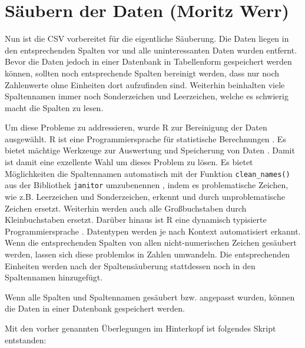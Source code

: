 \chapter{Säubern der Daten (Moritz Werr)} \label{chap:säubern}


Nun ist die CSV vorbereitet für die eigentliche Säuberung. Die Daten liegen in den entsprechenden Spalten vor und alle uninteressanten Daten wurden entfernt.
Bevor die Daten jedoch in einer Datenbank in Tabellenform gespeichert werden können, sollten noch entsprechende Spalten bereinigt werden, dass nur noch Zahlenwerte ohne Einheiten dort aufzufinden sind.
Weiterhin beinhalten viele Spaltennamen immer noch Sonderzeichen und Leerzeichen, welche es schwierig macht die Spalten zu lesen.

Um diese Probleme zu addressieren, wurde R zur Bereinigung der Daten ausgewählt.
R ist eine Programmiersprache für statistische Berechnungen \cite{noauthor_r_nodate}. Es bietet mächtige Werkzeuge zur Auswertung und Speicherung von Daten \cite{noauthor_r_nodate}. Damit ist damit eine exzellente Wahl um dieses Problem zu lösen.
Es bietet Möglichkeiten die Spaltennamen automatisch mit der Funktion  \lstinline |clean_names()| aus der Bibliothek \lstinline|janitor| umzubenennen \cite{noauthor_janitor_nodate}, indem es problematische Zeichen, wie z.B. Leerzeichen und Sonderzeichen, erkennt und durch unproblematische Zeichen ersetzt.
Weiterhin werden auch alle Großbuchstaben durch Kleinbuchstaben ersetzt.
Darüber hinaus ist R eine dynamisch typisierte Programmiersprache \cite{ewendorf_algorithmic_2019}. Datentypen werden je nach Kontext automatisiert erkannt.
Wenn die entsprechenden Spalten von allen nicht-numerischen Zeichen gesäubert werden, lassen sich diese problemlos in Zahlen umwandeln.
Die entsprechenden Einheiten werden nach der Spaltensäuberung stattdessen noch in den Spaltennamen hinzugefügt.

Wenn alle Spalten und Spaltennamen gesäubert bzw. angepasst wurden, können die Daten in einer Datenbank gespeichert werden.

Mit den vorher genannten Überlegungen im Hinterkopf ist folgendes Skript entstanden: 


\lstset{
	breaklines=true,         %
	breakatwhitespace=false, %
	basicstyle=\ttfamily,    %
}

